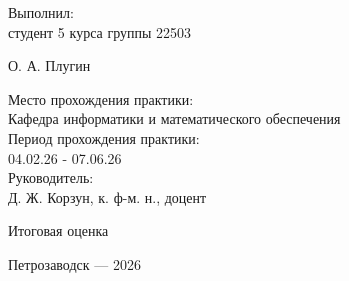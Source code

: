 \begin{flushright}
\parbox{11cm}{%
\renewcommand{\baselinestretch}{1.2}
\normalsize
	Выполнил:\\
студент 5 курса группы 22503
\begin{flushright}
	О. А. Плугин \sign[подпись]{4cm}
\end{flushright}



Место прохождения практики: \\ 
Кафедра информатики и математического обеспечения\\

Период прохождения практики: \\
04.02.26 - 07.06.26 \\


Руководитель:\\
Д. Ж. Корзун, к. ф-м. н., доцент \\
\begin{flushright}
\sign[подпись]{4cm}
\end{flushright}





Итоговая оценка
\begin{flushright}
  \sign[оценка]{4cm}
\end{flushright}
}
\end{flushright}

\vfill

\begin{center}
\large
    Петрозаводск --- 2026
\end{center}
